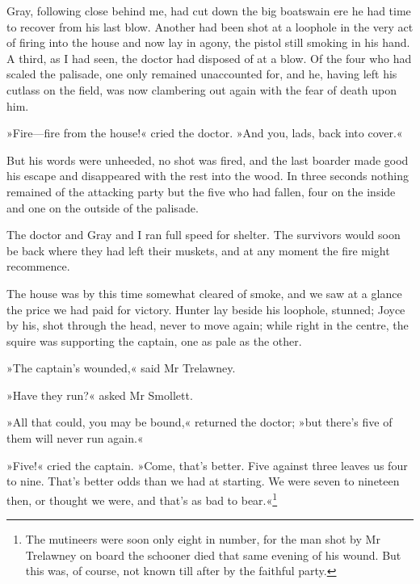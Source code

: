 Gray, following close behind me, had cut down the big boatswain ere he had time to recover from his last blow. Another had been shot at a loophole in the very act of firing into the house and now lay in agony, the pistol still smoking in his hand. A third, as I had seen, the doctor had disposed of at a blow. Of the four who had scaled the palisade, one only remained unaccounted for, and he, having left his cutlass on the field, was now clambering out again with the fear of death upon him.

»Fire—fire from the house!« cried the doctor. »And you, lads, back into cover.«

But his words were unheeded, no shot was fired, and the last boarder made good his escape and disappeared with the rest into the wood. In three seconds nothing remained of the attacking party but the five who had fallen, four on the inside and one on the outside of the palisade.

The doctor and Gray and I ran full speed for shelter. The survivors would soon be back where they had left their muskets, and at any moment the fire might recommence.

The house was by this time somewhat cleared of smoke, and we saw at a glance the price we had paid for victory. Hunter lay beside his loophole, stunned; Joyce by his, shot through the head, never to move again; while right in the centre, the squire was supporting the captain, one as pale as the other.

»The captain's wounded,« said Mr Trelawney.

»Have they run?« asked Mr Smollett.

»All that could, you may be bound,« returned the doctor; »but there's five of them will never run again.«

»Five!« cried the captain. »Come, that's better. Five against three leaves us four to nine. That's better odds than we had at starting. We were seven to nineteen then, or thought we were, and that's as bad to bear.«\footnote{The mutineers were soon only eight in number, for the man shot by Mr Trelawney on board the schooner died that same evening of his wound. But this was, of course, not known till after by the faithful party.}
